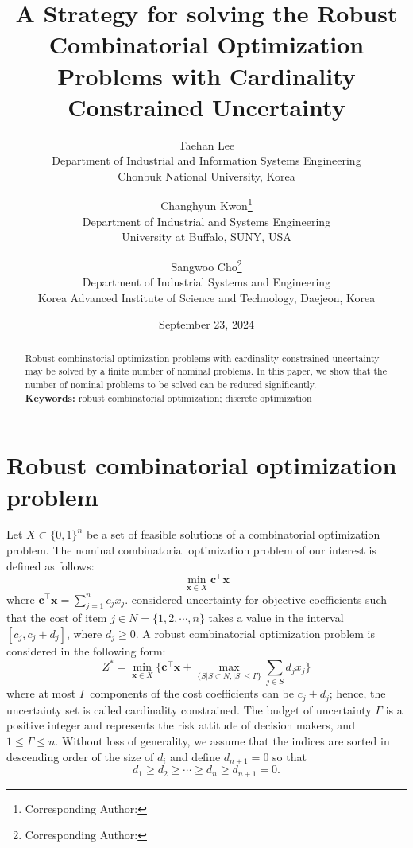 \documentclass[letterpaper, 10pt]{article}
\title{A Strategy for solving the Robust Combinatorial Optimization Problems with Cardinality Constrained Uncertainty}
\author{Taehan Lee\\
	Department of Industrial and Information Systems Engineering\\
	Chonbuk National University, Korea\\
    \and
    Changhyun Kwon\footnote{Corresponding Author: \email{chkwon@buffalo.edu}}\\Department of Industrial and Systems Engineering\\University at Buffalo, SUNY, USA\\
	\and
	Sangwoo Cho\footnote{Corresponding Author: \email{jswself@kaist.ac.kr}}\\Department of Industrial Systems and Engineering\\Korea Advanced Institute of Science and Technology, Daejeon, Korea}
\date{September 23, 2024}
\renewcommand{\vec}[1]{\bm{#1}}
\begin{document}
\maketitle

\begin{abstract}
Robust combinatorial optimization problems with cardinality constrained uncertainty may be solved by a finite number of nominal problems. In this paper, we show that the number of nominal problems to be solved can be reduced significantly. \\[0.5em]
\noindent\textbf{Keywords:} robust combinatorial optimization; discrete optimization
\end{abstract}







\section{Robust combinatorial optimization problem}
\label{sec:2}

Let $X \subset \{0, 1\}^n$ be a set of feasible solutions of a combinatorial optimization problem. The nominal combinatorial optimization problem of our interest is defined as follows:
\begin{equation}
\min_{\vec{x}\in X} \vec{c}^\top \vec{x}
\end{equation}
where $\vec{c}^\top \vec{x} = \sum_{j=1}^n c_j x_j$. \citet{Bertsimas2003} considered uncertainty for objective coefficients such that the cost of item $j \in N =\{1,2,\cdots,n\}$ takes a value in the interval $[c_j, c_j + d_j]$, where $d_j \geq 0$. A robust combinatorial optimization problem is considered in the following form:
\begin{equation} \label{problem}
Z^* = \min_{\vec{x}\in X} \bigg\{\vec{c}^\top \vec{x} + \max_{\{S|S \subset N, |S| \leq \Gamma\}} \sum_{j \in S} d_j x_j \bigg\}
\end{equation}
where at most $\Gamma$ components of the cost coefficients can be $c_j+d_j$; hence, the uncertainty set is called cardinality constrained. The budget of uncertainty $\Gamma$ is a positive integer and represents the risk attitude of decision makers, and $1 \leq \Gamma \leq n$. Without loss of generality, we assume that the indices are sorted in descending order of the size of $d_i$ and define $d_{n+1}=0$ so that 
\begin{equation}
	d_1 \geq d_2 \geq \cdots \geq d_n \geq d_{n+1} = 0.
\end{equation}
\end{document}
